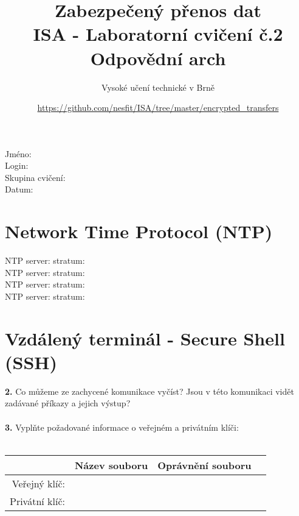 \documentclass[a4paper,11pt]{article}
\title{Zabezpečený přenos dat\\
{\bf\large ISA - Laboratorní cvičení č.2}\\
{\bf\large Odpovědní arch}}
\author{Vysoké učení technické v Brně}
\date{\url{https://github.com/nesfit/ISA/tree/master/encrypted_transfers}}
\begin{document}
{\let\newpage\relax\maketitle}

Jméno:\\
Login:\\
Skupina cvičení:\\
Datum:

\section{Network Time Protocol (NTP)}
NTP server: \underline{\hspace{4cm}}\hspace{1cm} stratum: \underline{\hspace{1cm}} \\
NTP server: \underline{\hspace{4cm}}\hspace{1cm} stratum: \underline{\hspace{1cm}} \\
NTP server: \underline{\hspace{4cm}}\hspace{1cm} stratum: \underline{\hspace{1cm}} \\
NTP server: \underline{\hspace{4cm}}\hspace{1cm} stratum: \underline{\hspace{1cm}} \\

\section{Vzdálený terminál - Secure Shell (SSH)}
\textbf{2.} Co můžeme ze zachycené komunikace vyčíst? Jsou v této komunikaci vidět zadávané příkazy a jejich výstup?\\

\underline{\hspace{16cm}}
~\\
\textbf{3.} Vyplňte požadované informace o veřejném a privátním klíči:\\
~\\
\begin{tabular}{|r|c|c|c|}
\hline
~ & Název souboru & Oprávnění souboru \\
\hline
Veřejný klíč: & & \\
\hline
Privátní klíč: & & \\
\hline
\end{tabular}
\vspace{1em}
\end{document}
